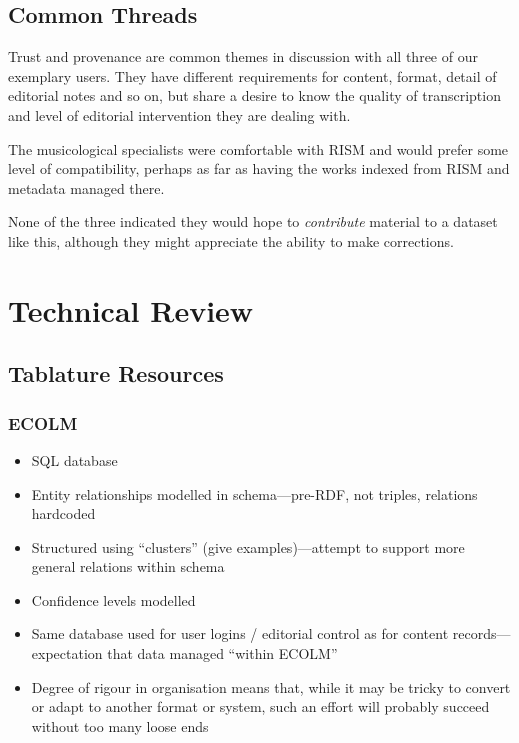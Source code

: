 \documentclass[sigconf]{acmart}
\begin{document}
\begin{sloppypar}
  \subsection{Common Threads}

  Trust and provenance are common themes in discussion with all three
  of our exemplary users. They have different requirements for
  content, format, detail of editorial notes and so on, but share a
  desire to know the quality of transcription and level of editorial
  intervention they are dealing with.

  The musicological specialists were comfortable with RISM and would
  prefer some level of compatibility, perhaps as far as having the
  works indexed from RISM and metadata managed there.

  None of the three indicated they would hope to {\em contribute}
  material to a dataset like this, although they might appreciate the
  ability to make corrections.
  
  \section{Technical Review}

  \subsection{Tablature Resources}
  
  \subsubsection{ECOLM}

  \begin{itemize}
  \item SQL database
  \item Entity relationships modelled in schema---pre-RDF, not
    triples, relations hardcoded
  \item Structured using ``clusters'' (give examples)---attempt to
    support more general relations within schema
  \item Confidence levels modelled
  \item Same database used for user logins / editorial control as for
    content records---expectation that data managed ``within ECOLM''
  \item Degree of rigour in organisation means that, while it may be
    tricky to convert or adapt to another format or system, such an
    effort will probably succeed without too many loose ends
  \end{itemize}


\end{sloppypar}
\end{document}
